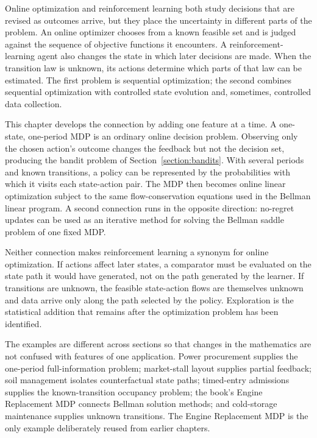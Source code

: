 Online optimization and reinforcement learning both study decisions that are revised as outcomes arrive, but they place the uncertainty in different parts of the problem. An online optimizer chooses from a known feasible set and is judged against the sequence of objective functions it encounters. A reinforcement-learning agent also changes the state in which later decisions are made. When the transition law is unknown, its actions determine which parts of that law can be estimated. The first problem is sequential optimization; the second combines sequential optimization with controlled state evolution and, sometimes, controlled data collection.

This chapter develops the connection by adding one feature at a time. A one-state, one-period MDP is an ordinary online decision problem. Observing only the chosen action's outcome changes the feedback but not the decision set, producing the bandit problem of Section~\ref{section:bandits}. With several periods and known transitions, a policy can be represented by the probabilities with which it visits each state-action pair. The MDP then becomes online linear optimization subject to the same flow-conservation equations used in the Bellman linear program. A second connection runs in the opposite direction: no-regret updates can be used as an iterative method for solving the Bellman saddle problem of one fixed MDP.

Neither connection makes reinforcement learning a synonym for online optimization. If actions affect later states, a comparator must be evaluated on the state path it would have generated, not on the path generated by the learner. If transitions are unknown, the feasible state-action flows are themselves unknown and data arrive only along the path selected by the policy. Exploration is the statistical addition that remains after the optimization problem has been identified.

The examples are different across sections so that changes in the mathematics are not confused with features of one application. Power procurement supplies the one-period full-information problem; market-stall layout supplies partial feedback; soil management isolates counterfactual state paths; timed-entry admissions supplies the known-transition occupancy problem; the book's Engine Replacement MDP connects Bellman solution methods; and cold-storage maintenance supplies unknown transitions. The Engine Replacement MDP is the only example deliberately reused from earlier chapters.

